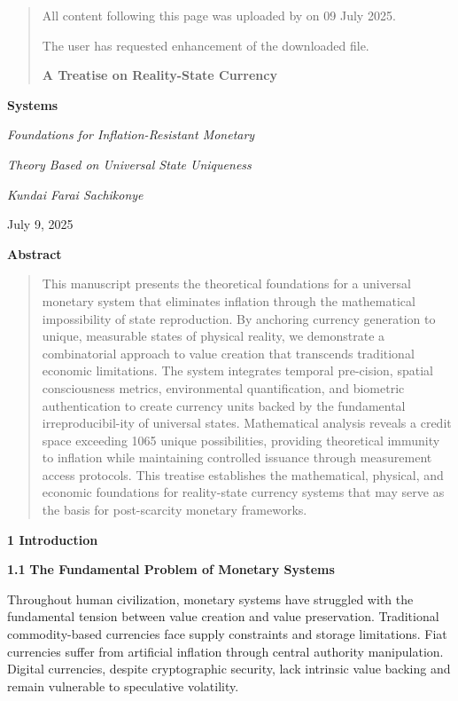 \documentclass[
]{article}
\begin{document}
\begin{quote}
All content following this page was uploaded by on 09 July 2025.

The user has requested enhancement of the downloaded file.

\textbf{A Treatise on Reality-State Currency}
\end{quote}

\textbf{Systems}

\emph{Foundations for Inflation-Resistant Monetary}

\emph{Theory Based on Universal State Uniqueness}

\emph{Kundai Farai Sachikonye}

July 9, 2025

\textbf{Abstract}

\begin{quote}
This manuscript presents the theoretical foundations for a universal
monetary system that eliminates inflation through the mathematical
impossibility of state reproduction. By anchoring currency generation to
unique, measurable states of physical reality, we demonstrate a
combinatorial approach to value creation that transcends traditional
economic limitations. The system integrates temporal pre-cision, spatial
consciousness metrics, environmental quantification, and biometric
authentication to create currency units backed by the fundamental
irreproducibil-ity of universal states. Mathematical analysis reveals a
credit space exceeding 1065 unique possibilities, providing theoretical
immunity to inflation while maintaining controlled issuance through
measurement access protocols. This treatise establishes the
mathematical, physical, and economic foundations for reality-state
currency systems that may serve as the basis for post-scarcity monetary
frameworks.
\end{quote}

\textbf{1 Introduction}

\textbf{1.1} \textbf{The Fundamental Problem of Monetary Systems}

Throughout human civilization, monetary systems have struggled with the
fundamental tension between value creation and value preservation.
Traditional commodity-based currencies face supply constraints and
storage limitations. Fiat currencies suffer from artificial inflation
through central authority manipulation. Digital currencies, despite
cryptographic security, lack intrinsic value backing and remain
vulnerable to speculative volatility.
\end{document}
